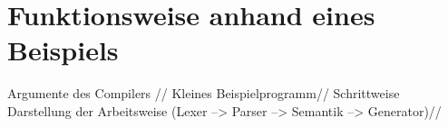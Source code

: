 \chapter{Funktionsweise anhand eines Beispiels}

Argumente des Compilers //
Kleines Beispielprogramm//
Schrittweise Darstellung der Arbeitsweise (Lexer --> Parser --> Semantik --> Generator)//